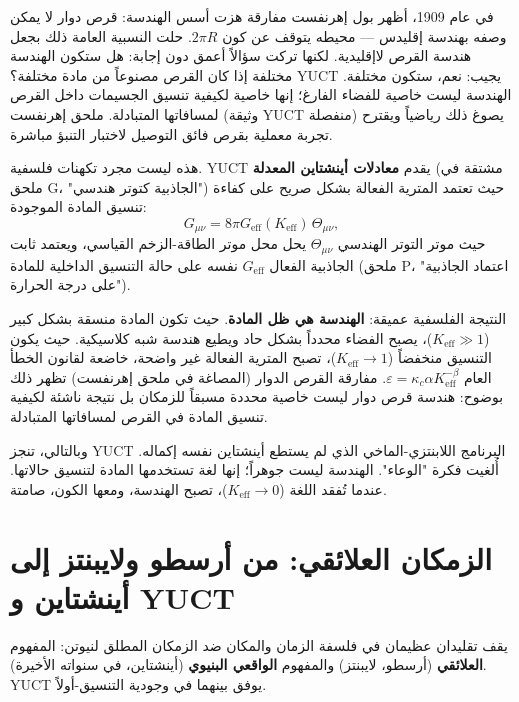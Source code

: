 \documentclass[12pt,a4paper]{article}
\begin{document}
	في عام 1909، أظهر بول إهرنفست مفارقة هزت أسس الهندسة: قرص دوار لا يمكن وصفه بهندسة إقليدس — محيطه يتوقف عن كون \(2\pi R\). حلت النسبية العامة ذلك بجعل هندسة القرص لاإقليدية. لكنها تركت سؤالاً أعمق دون إجابة: هل ستكون الهندسة مختلفة إذا كان القرص مصنوعاً من مادة مختلفة؟ YUCT يجيب: نعم، ستكون مختلفة. الهندسة ليست خاصية للفضاء الفارغ؛ إنها خاصية لكيفية تنسيق الجسيمات داخل القرص لمسافاتها المتبادلة. ملحق إهرنفست (وثيقة YUCT منفصلة) يصوغ ذلك رياضياً ويقترح تجربة معملية بقرص فائق التوصيل لاختبار التنبؤ مباشرة.
	
	هذه ليست مجرد تكهنات فلسفية. YUCT يقدم \textbf{معادلات أينشتاين المعدلة} (مشتقة في ملحق G، "الجاذبية كتوتر هندسي") حيث تعتمد المترية الفعالة بشكل صريح على كفاءة تنسيق المادة الموجودة:
	\[
	G_{\mu\nu} = 8\pi G_{\mathrm{eff}}(K_{\mathrm{eff}}) \, \Theta_{\mu\nu},
	\]
	حيث موتر التوتر الهندسي \(\Theta_{\mu\nu}\) يحل محل موتر الطاقة-الزخم القياسي، ويعتمد ثابت الجاذبية الفعال \(G_{\mathrm{eff}}\) نفسه على حالة التنسيق الداخلية للمادة (ملحق P، "اعتماد الجاذبية على درجة الحرارة").
	
	النتيجة الفلسفية عميقة: \textbf{الهندسة هي ظل المادة}. حيث تكون المادة منسقة بشكل كبير (\(K_{\mathrm{eff}} \gg 1\))، يصبح الفضاء محدداً بشكل حاد ويطيع هندسة شبه كلاسيكية. حيث يكون التنسيق منخفضاً (\(K_{\mathrm{eff}} \to 1\))، تصبح المترية الفعالة غير واضحة، خاضعة لقانون الخطأ العام \(\varepsilon = \kappa_c \alpha K_{\mathrm{eff}}^{-\beta}\). مفارقة القرص الدوار (المصاغة في ملحق إهرنفست) تظهر ذلك بوضوح: هندسة قرص دوار ليست خاصية محددة مسبقاً للزمكان بل نتيجة ناشئة لكيفية تنسيق المادة في القرص لمسافاتها المتبادلة.
	
	وبالتالي، تنجز YUCT البرنامج اللابنتزي-الماخي الذي لم يستطع أينشتاين نفسه إكماله. أُلغيت فكرة "الوعاء". الهندسة ليست جوهراً؛ إنها لغة تستخدمها المادة لتنسيق حالاتها. عندما تُفقد اللغة (\(K_{\mathrm{eff}} \to 0\))، تصبح الهندسة، ومعها الكون، صامتة.
	
	\section{الزمكان العلائقي: من أرسطو ولايبنتز إلى أينشتاين و YUCT}
	
	يقف تقليدان عظيمان في فلسفة الزمان والمكان ضد الزمكان المطلق لنيوتن: المفهوم \textbf{العلائقي} (أرسطو، لايبنتز) والمفهوم \textbf{الواقعي البنيوي} (أينشتاين، في سنواته الأخيرة). YUCT يوفق بينهما في وجودية التنسيق-أولاً.
	
\end{document}
